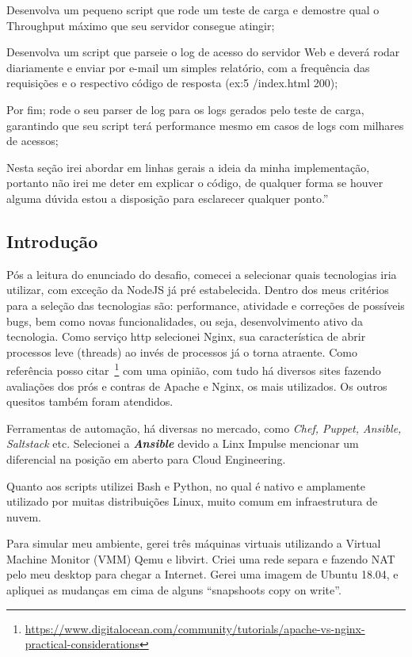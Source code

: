Desenvolva um pequeno script que rode um teste de carga e demostre
qual o Throughput máximo que seu servidor consegue atingir; 

Desenvolva um script que parseie o log de acesso do servidor Web e
deverá rodar diariamente e enviar por e-mail um simples relatório, com
a frequência das requisições e o respectivo código de resposta (ex:5
/index.html 200); 

Por fim; rode o seu parser de log para os logs gerados pelo teste de
carga, garantindo que seu script terá performance mesmo em casos de
logs com milhares de acessos;

Nesta seção irei abordar em linhas gerais a ideia da minha
implementação, portanto não irei me deter em explicar o código, de
qualquer forma se houver alguma dúvida estou a disposição para
esclarecer qualquer ponto.''


\subsection{Introdução}
Pós a leitura do enunciado do desafio, comecei a selecionar quais
tecnologias iria utilizar, com exceção da NodeJS já pré
estabelecida. Dentro dos meus critérios para a seleção das tecnologias
são: performance, atividade e correções de possíveis bugs, bem como
novas funcionalidades, ou seja, desenvolvimento ativo da tecnologia.
Como serviço http selecionei Nginx, sua característica de abrir
processos leve (threads) ao invés de processos já o torna
atraente. Como referência posso
citar~\footnote{\href{https://www.digitalocean.com/community/tutorials/apache-vs-nginx-practical-considerations}{https://www.digitalocean.com/community/tutorials/apache-vs-nginx-practical-considerations}}
com uma opinião, com tudo há diversos sites fazendo avaliações dos
prós e contras de Apache e Nginx, os mais utilizados. Os outros
quesitos também foram atendidos.

Ferramentas de automação, há diversas no mercado, como \emph{Chef, Puppet,
Ansible, Saltstack} etc. Selecionei a \emph{\textbf{Ansible}} devido a Linx Impulse
mencionar um diferencial na posição em aberto para Cloud Engineering.

Quanto aos scripts utilizei Bash e Python, no qual é nativo e
amplamente utilizado por muitas distribuições Linux, muito comum em
infraestrutura de nuvem.

Para simular meu ambiente, gerei três máquinas virtuais utilizando a
Virtual Machine Monitor (VMM) Qemu e libvirt. Criei uma rede separa e
fazendo NAT pelo meu desktop para chegar a Internet. Gerei uma imagem
de Ubuntu 18.04, e apliquei as mudanças em
cima de alguns ``snapshoots copy on write''.

